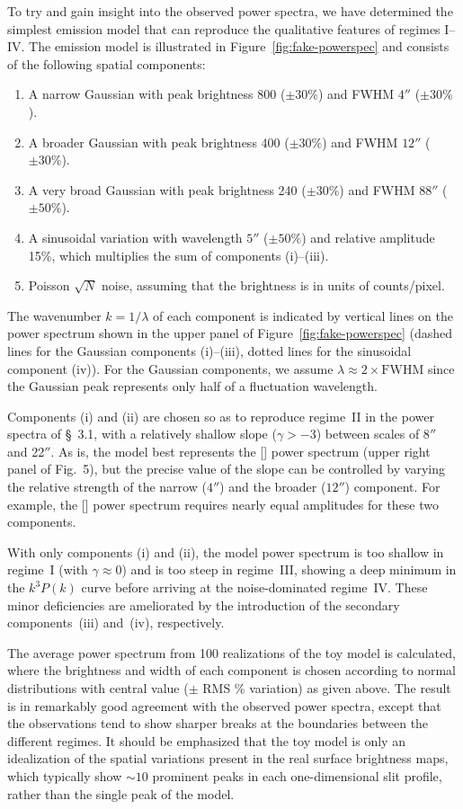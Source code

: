 \documentclass[useAMS,usenatbib]{mnras}
\newcommand\oiii{[\ion{O}{iii}]}
\newcommand\nii{[\ion{N}{ii}]}
\begin{document}
To try and gain insight into the observed power spectra, we have
determined the simplest emission model that can reproduce the
qualitative features of regimes I--IV.  The emission model is
illustrated in Figure~\ref{fig:fake-powerspec} and consists of the
following spatial components:
\begin{enumerate}
\item A narrow Gaussian with peak brightness 800 (\(\pm 30\%\)) and FWHM
  \(4''\) (\(\pm 30\%\)).
\item A broader Gaussian with peak brightness 400 (\(\pm 30\%\)) and
  FWHM \(12''\) (\(\pm 30\%\)).
\item A very broad Gaussian with peak brightness 240 (\(\pm 30\%\)) and
  FWHM \(88''\) (\(\pm 50\%\)). 
\item A sinusoidal variation with wavelength \(5''\) (\(\pm
  50\%\)) and relative amplitude 15\%, which multiplies the sum of
  components (i)--(iii). 
\item Poisson \(\sqrt{N}\) noise, assuming that the brightness is in
  units of counts/pixel.
\end{enumerate}
The wavenumber \(k =
1/\lambda\) of each component is
indicated by vertical lines on the power spectrum shown in the upper
panel of Figure~\ref{fig:fake-powerspec} (dashed lines for the
Gaussian components (i)--(iii), dotted lines for the sinusoidal
component (iv)). For the Gaussian components, we assume \(\lambda
\approx 2 \times \mathrm{FWHM}\) since the Gaussian peak represents
only half of a fluctuation wavelength. 

Components (i) and (ii) are chosen so as to reproduce regime~II in the
power spectra of \S~3.1, with a relatively shallow slope
(\(\gamma > -3\)) between scales of 8\(''\) and 22\(''\).  As is, the
model best represents the \nii{} power spectrum (upper right panel of
Fig.~5), but the precise value of the slope can be controlled by
varying the relative strength of the narrow (\(4''\)) and the broader
(\(12''\)) component.  For example, the \oiii{} power spectrum
requires nearly equal amplitudes for these two components.  

With only components (i) and (ii), the model power spectrum is too shallow
in regime~I (with \(\gamma \approx 0\)) and is too steep in
regime~III, showing a deep minimum in the \(k^3 P(k)\) curve before
arriving at the noise-dominated regime~IV.  These minor deficiencies are
ameliorated by the introduction of the secondary components~(iii)
and~(iv), respectively. 

The average power spectrum from 100 realizations of the toy model is
calculated, where the brightness and width of each component is chosen
according to normal distributions with central value (\(\pm\) RMS \%
variation) as given above.  The result is in remarkably good agreement
with the observed power spectra, except that the observations tend to
show sharper breaks at the boundaries between the different
regimes. It should be emphasized that the toy model is only an
idealization of the spatial variations present in the real surface
brightness maps, which typically show \(\sim 10\) prominent peaks in
each one-dimensional slit profile, rather than the single peak of the
model.




\end{document}
